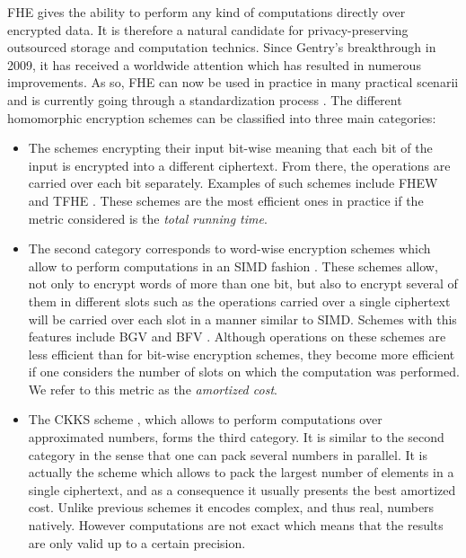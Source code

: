 \ac{FHE} gives the ability to perform any kind of computations directly over encrypted data. It is therefore a natural candidate for privacy-preserving outsourced storage and computation technics. Since Gentry's breakthrough in 2009, it has received a worldwide attention which has resulted in numerous improvements. As so, \ac{FHE} can now be used in practice in many practical scenarii \cite{KL15,BCIV17,BMMP18} and is currently going through a standardization process \cite{HomomorphicEncryptionSecurityStandard}. The different homomorphic encryption schemes can be classified into three main categories:

\begin{itemize}
\item The schemes encrypting their input bit-wise meaning that each bit of the input is encrypted into a different ciphertext. From there, the operations are carried over each bit separately. Examples of such schemes include FHEW \cite{DM15} and TFHE \cite{CGGI16}. These schemes are the most efficient ones in practice if the metric considered is the \emph{total running time}.
  
\item The second category corresponds to word-wise encryption schemes which allow to perform computations in an \ac{SIMD} fashion \cite{SV14}. These schemes allow, not only to encrypt words of more than one bit, but also to encrypt several of them in different slots such as the operations carried over a single ciphertext will be carried over each slot in a manner similar to \ac{SIMD}. Schemes with this features include BGV \cite{BGV12} and BFV \cite{FV12}. Although operations on these schemes are less efficient than for bit-wise encryption schemes, they become more efficient if one considers the number of slots on which the computation was performed. We refer to this metric as the \emph{amortized cost}.

\item The CKKS scheme \cite{CKKS17}, which allows to perform computations over approximated numbers, forms the third category. It is similar to the second category in the sense that one can pack several numbers in parallel. It is actually the scheme which allows to pack the largest number of elements in a single ciphertext, and as a consequence it usually presents the best amortized cost. Unlike previous schemes it encodes complex, and thus real, numbers natively. However computations are not exact which means that the results are only valid up to a certain precision. 
\end{itemize}

